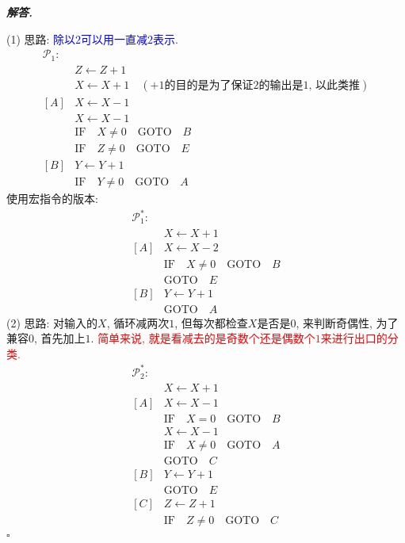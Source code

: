 \documentclass[10pt, a4paper, oneside]{ctexart}
\newenvironment{solution}{%
  \par\noindent\textbf{\textit{解答. }}\ignorespaces
}{%
  \hfill\ensuremath{\square}\par
}
\begin{document}
\begin{solution}
    (1) 思路: \textcolor{blue}{除以$2$可以用一直减$2$表示.}
    \begin{align*}
        \mathscr{P}_1:&\\
        &Z\leftarrow Z+1\\
        &X\leftarrow X+1\quad(\text{$+1$的目的是为了保证$2$的输出是$1$, 以此类推})\\
        [A]&X \leftarrow X-1\\
        &X \leftarrow X-1\\
        &\text{IF} \quad X\neq 0 \quad \text{GOTO} \quad B\\
        &\text{IF} \quad Z\neq 0 \quad \text{GOTO} \quad E\\
        [B]&Y\leftarrow Y+1\\
        &\text{IF} \quad Y\neq 0 \quad \text{GOTO} \quad A
    \end{align*}
    使用宏指令的版本:
    \begin{align*}
        \mathscr{P}_1^*:&\\
        &X\leftarrow X+1\\
        [A]&X \leftarrow X-2\\
        &\text{IF} \quad X\neq 0 \quad \text{GOTO} \quad B\\
        & \text{GOTO}\quad E\\
        [B]&Y\leftarrow Y+1\\
        &\text{GOTO}\quad A
    \end{align*}
    (2) 思路: 对输入的$X$, 循环减两次$1$, 但每次都检查$X$是否是$0$, 来判断奇偶性, 为了兼容$0$, 首先加上$1$. \textcolor{red}{简单来说, 就是看减去的是奇数个还是偶数个$1$来进行出口的分类.}
    \begin{align*}
        \mathscr{P}_2^*:&\\
        &X\leftarrow X+1\\
        [A]&X\leftarrow X-1\\
        &\text{IF}\quad X=0 \quad \text{GOTO}\quad  B\\
        &X\leftarrow X-1\\
        &\text{IF}\quad X\neq 0 \quad \text{GOTO}\quad  A\\
        & \text{GOTO} \quad C\\
        [B]&Y\leftarrow Y+1\\
        &\text{GOTO}\quad E\\
        [C]&Z\leftarrow Z+1\\
        &\text{IF}\quad Z\neq 0 \quad \text{GOTO}\quad  C\\

\end{align*}
\end{solution}
\end{document}
